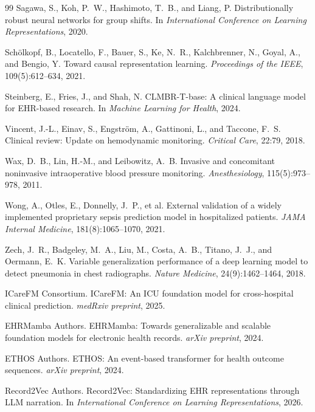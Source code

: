 \documentclass{article}
\begin{document}
{\begin{thebibliography}{99}
Sagawa, S., Koh, P.~W., Hashimoto, T.~B., and Liang, P.
\newblock Distributionally robust neural networks for group shifts.
\newblock In \emph{International Conference on Learning Representations}, 2020.

Sch\"{o}lkopf, B., Locatello, F., Bauer, S., Ke, N.~R., Kalchbrenner, N., Goyal, A., and Bengio, Y.
\newblock Toward causal representation learning.
\newblock \emph{Proceedings of the IEEE}, 109(5):612--634, 2021.

Steinberg, E., Fries, J., and Shah, N.
\newblock CLMBR-T-base: A clinical language model for EHR-based research.
\newblock In \emph{Machine Learning for Health}, 2024.

Vincent, J.-L., Einav, S., Engstr\"{o}m, A., Gattinoni, L., and Taccone, F.~S.
\newblock Clinical review: Update on hemodynamic monitoring.
\newblock \emph{Critical Care}, 22:79, 2018.

Wax, D.~B., Lin, H.-M., and Leibowitz, A.~B.
\newblock Invasive and concomitant noninvasive intraoperative blood pressure monitoring.
\newblock \emph{Anesthesiology}, 115(5):973--978, 2011.

Wong, A., Otles, E., Donnelly, J.~P., et al.
\newblock External validation of a widely implemented proprietary sepsis prediction model in hospitalized patients.
\newblock \emph{JAMA Internal Medicine}, 181(8):1065--1070, 2021.

Zech, J.~R., Badgeley, M.~A., Liu, M., Costa, A.~B., Titano, J.~J., and Oermann, E.~K.
\newblock Variable generalization performance of a deep learning model to detect pneumonia in chest radiographs.
\newblock \emph{Nature Medicine}, 24(9):1462--1464, 2018.

ICareFM Consortium.
\newblock ICareFM: An ICU foundation model for cross-hospital clinical prediction.
\newblock \emph{medRxiv preprint}, 2025.

EHRMamba Authors.
\newblock EHRMamba: Towards generalizable and scalable foundation models for electronic health records.
\newblock \emph{arXiv preprint}, 2024.

ETHOS Authors.
\newblock ETHOS: An event-based transformer for health outcome sequences.
\newblock \emph{arXiv preprint}, 2024.

Record2Vec Authors.
\newblock Record2Vec: Standardizing EHR representations through LLM narration.
\newblock In \emph{International Conference on Learning Representations}, 2026.

\end{thebibliography}
}
\end{document}
